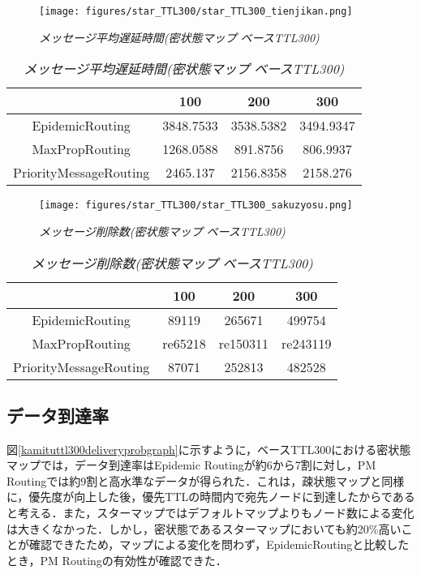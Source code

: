 \documentclass[11pt]{icsthesis}
\begin{document}
\newpage

\begin{figure}[h]
\centering
\texttt{[image: figures/star\_TTL300/star\_TTL300\_tienjikan.png]}
\caption[]{\it{メッセージ平均遅延時間(密状態マップ ベースTTL300)}}
\label{kamituttl300latencyavggraph}
\end{figure}

\begin{table}[H]
 \begin{center}
      \caption[]{\it{メッセージ平均遅延時間(密状態マップ ベースTTL300)}}
      \label{kamituttl300latencyavg}
      \begin{tabular}{|c|c|c|c|}
\hline
&100&200&300\\
\hline
EpidemicRouting&3848.7533&3538.5382&3494.9347\\
\hline
MaxPropRouting&1268.0588&891.8756&806.9937\\
\hline
PriorityMessageRouting&2465.137&2156.8358&2158.276\\
\hline
      \end{tabular}
    \end{center}
\end{table}

\begin{figure}[h]
\centering
\texttt{[image: figures/star\_TTL300/star\_TTL300\_sakuzyosu.png]}
\caption[]{\it{メッセージ削除数(密状態マップ ベースTTL300)}}
\label{kamituttl300droppedgraph}
\end{figure}

\begin{table}[H]
 \begin{center}
      \caption[]{\it{メッセージ削除数(密状態マップ ベースTTL300)}}
      \label{kamituttl300dropped}
      \begin{tabular}{|c|c|c|c|}
\hline
&100&200&300\\
\hline
EpidemicRouting&89119&265671&499754\\
\hline
MaxPropRouting&re65218&re150311&re243119\\
\hline
PriorityMessageRouting&87071&252813&482528\\
\hline
      \end{tabular}
    \end{center}
\end{table}

\subsection{データ到達率}
図\ref{kamituttl300deliveryprobgraph}に示すように，ベースTTL300における密状態マップでは，データ到達率はEpidemic Routingが約6から7割に対し，PM Routingでは約9割と高水準なデータが得られた．これは，疎状態マップと同様に，優先度が向上した後，優先TTLの時間内で宛先ノードに到達したからであると考える．また，スターマップではデフォルトマップよりもノード数による変化は大きくなかった．しかし，密状態であるスターマップにおいても約20\%高いことが確認できたため，マップによる変化を問わず，EpidemicRoutingと比較したとき，PM Routingの有効性が確認できた．
\end{document}
